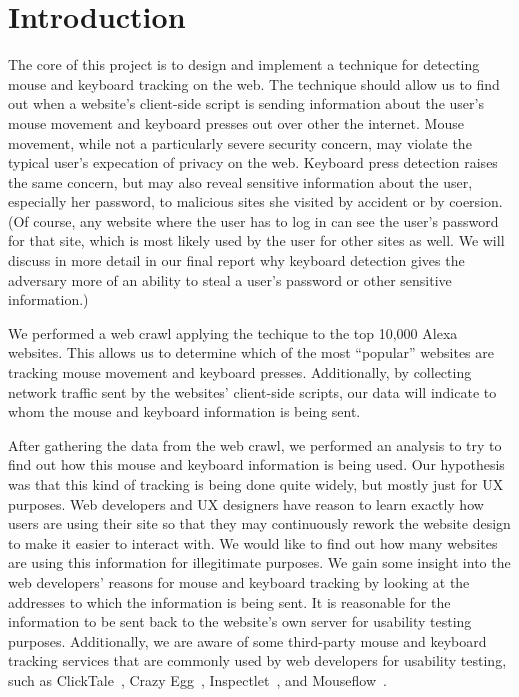 \documentclass[letterpaper,twocolumn,10pt]{article}
\begin{document}
\section{Introduction}
The core of this project is to design and implement a technique for detecting mouse and keyboard tracking on the web. The technique should allow us to find out when a website's client-side script is sending information about the user's mouse movement and keyboard presses out over other the internet. Mouse movement, while not a particularly severe security concern, may violate the typical user's expecation of privacy on the web. Keyboard press detection raises the same concern, but may also reveal sensitive information about the user, especially her password, to malicious sites she visited by accident or by coersion. (Of course, any website where the user has to log in can see the user's password for that site, which is most likely used by the user for other sites as well. We will discuss in more detail in our final report why keyboard detection gives the adversary more of an ability to steal a user's password or other sensitive information.)

We performed a web crawl applying the techique to the top 10,000 Alexa websites. This allows us to determine which of the most ``popular'' websites are tracking mouse movement and keyboard presses. Additionally, by collecting network traffic sent by the websites' client-side scripts, our data will indicate to whom the mouse and keyboard information is being sent.

After gathering the data from the web crawl, we performed an analysis to try to find out how this mouse and keyboard information is being used. Our hypothesis was that this kind of tracking is being done quite widely, but mostly just for UX purposes. Web developers and UX designers have reason to learn exactly how users are using their site so that they may continuously rework the website design to make it easier to interact with. We would like to find out how many websites are using this information for illegitimate purposes. We gain some insight into the web developers' reasons for mouse and keyboard tracking by looking at the addresses to which the information is being sent. It is reasonable for the information to be sent back to the website's own server for usability testing purposes. Additionally, we are aware of some third-party mouse and keyboard tracking services that are commonly used by web developers for usability testing, such as ClickTale~\cite{clicktale}, Crazy Egg~\cite{crazyegg}, Inspectlet~\cite{inspectlet}, and Mouseflow~\cite{mouseflow}. %
\end{document}
